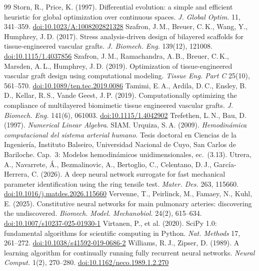 \begin{thebibliography}{99}
 Storn, R., Price, K. (1997). Differential evolution: a simple and efficient heuristic for global optimization over continuous spaces. \emph{J. Global Optim.} 11, 341--359. \href{https://doi.org/10.1023/A:1008202821328}{doi:10.1023/A:1008202821328}
 Szafron, J.\,M., Breuer, C.\,K., Wang, Y., Humphrey, J.\,D. (2017). Stress analysis-driven design of bilayered scaffolds for tissue-engineered vascular grafts. \emph{J. Biomech. Eng.} 139(12), 121008. \href{https://doi.org/10.1115/1.4037856}{doi:10.1115/1.4037856}
 Szafron, J.\,M., Ramachandra, A.\,B., Breuer, C.\,K., Marsden, A.\,L., Humphrey, J.\,D. (2019). Optimization of tissue-engineered vascular graft design using computational modeling. \emph{Tissue Eng. Part C} 25(10), 561--570. \href{https://doi.org/10.1089/ten.tec.2019.0086}{doi:10.1089/ten.tec.2019.0086}
 Tamimi, E.\,A., Ardila, D.\,C., Ensley, B.\,D., Kellar, R.\,S., Vande Geest, J.\,P. (2019). Computationally optimizing the compliance of multilayered biomimetic tissue engineered vascular grafts. \emph{J. Biomech. Eng.} 141(6), 061003. \href{https://doi.org/10.1115/1.4042902}{doi:10.1115/1.4042902}
 Trefethen, L.\,N., Bau, D. (1997). \emph{Numerical Linear Algebra}. SIAM.
 Urquiza, S.\,A. (2009). \emph{Hemodinámica computacional del sistema arterial humano}. Tesis doctoral en Ciencias de la Ingeniería, Instituto Balseiro, Universidad Nacional de Cuyo, San Carlos de Bariloche. Cap.~3: Modelos hemodinámicos unidimensionales, ec.~(3.13).
 Utrera, A., Navarrete, \'A., Bezmalinovic, A., Bertoglio, C., Celentano, D.\,J., García-Herrera, C. (2026). A deep neural network surrogate for fast mechanical parameter identification using the ring tensile test. \emph{Mater. Des.} 263, 115660. \href{https://doi.org/10.1016/j.matdes.2026.115660}{doi:10.1016/j.matdes.2026.115660}
 Vervenne, T., Peirlinck, M., Famaey, N., Kuhl, E. (2025). Constitutive neural networks for main pulmonary arteries: discovering the undiscovered. \emph{Biomech. Model. Mechanobiol.} 24(2), 615--634. \href{https://doi.org/10.1007/s10237-025-01930-1}{doi:10.1007/s10237-025-01930-1}
 Virtanen, P., et al. (2020). SciPy 1.0: fundamental algorithms for scientific computing in Python. \emph{Nat. Methods} 17, 261--272. \href{https://doi.org/10.1038/s41592-019-0686-2}{doi:10.1038/s41592-019-0686-2}
 Williams, R.\,J., Zipser, D. (1989). A learning algorithm for continually running fully recurrent neural networks. \emph{Neural Comput.} 1(2), 270--280. \href{https://doi.org/10.1162/neco.1989.1.2.270}{doi:10.1162/neco.1989.1.2.270}
\end{thebibliography}

